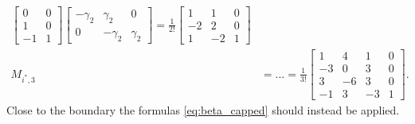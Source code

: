 \begin{subequations}
\begin{align}
\begin{bmatrix}
      0 & 0 \\ 1 & 0 \\ -1 & 1
    \end{bmatrix} \begin{bmatrix}
      - \gamma_{2} & \gamma_{2}   & 0          \\
      0            & - \gamma_{2} & \gamma_{2}
    \end{bmatrix} = \frac{1}{2!} \begin{bmatrix} 1 & 1 & 0 \\ -2 & 2 & 0 \\ 1 & -2 & 1  \end{bmatrix} \\
    M_{i^*, 3} & = \hdots = \frac{1}{3!} \begin{bmatrix} 1 & 4 & 1 & 0 \\ -3 & 0 & 3 & 0 \\ 3 & -6 & 3 & 0 \\ -1 & 3 & -3 & 1 \end{bmatrix}.
  \end{align}
\end{subequations}
Close to the boundary the formulas \eqref{eq:beta_capped} should instead be applied.